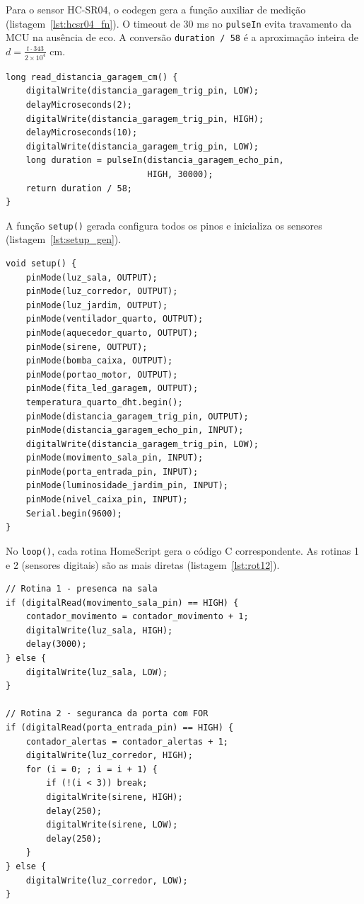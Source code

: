 \documentclass[conference]{IEEEtran}
\begin{document}
Para o sensor HC-SR04, o codegen gera a função auxiliar de medição
(listagem~\ref{lst:hcsr04_fn}). O timeout de 30 ms no \texttt{pulseIn}
evita travamento da MCU na ausência de eco. A conversão
\texttt{duration / 58} é a aproximação inteira de
$d = \frac{t \cdot 343}{2 \times 10^{4}}$ cm.

\begin{lstlisting}[style=csmall,caption={Função auxiliar gerada para o HC-SR04.},label={lst:hcsr04_fn}]
long read_distancia_garagem_cm() {
    digitalWrite(distancia_garagem_trig_pin, LOW);
    delayMicroseconds(2);
    digitalWrite(distancia_garagem_trig_pin, HIGH);
    delayMicroseconds(10);
    digitalWrite(distancia_garagem_trig_pin, LOW);
    long duration = pulseIn(distancia_garagem_echo_pin,
                            HIGH, 30000);
    return duration / 58;
}
\end{lstlisting}

A função \texttt{setup()} gerada configura todos os pinos e inicializa os
sensores (listagem~\ref{lst:setup_gen}).

\begin{lstlisting}[style=csmall,caption={Função \texttt{setup()} gerada.},label={lst:setup_gen}]
void setup() {
    pinMode(luz_sala, OUTPUT);
    pinMode(luz_corredor, OUTPUT);
    pinMode(luz_jardim, OUTPUT);
    pinMode(ventilador_quarto, OUTPUT);
    pinMode(aquecedor_quarto, OUTPUT);
    pinMode(sirene, OUTPUT);
    pinMode(bomba_caixa, OUTPUT);
    pinMode(portao_motor, OUTPUT);
    pinMode(fita_led_garagem, OUTPUT);
    temperatura_quarto_dht.begin();
    pinMode(distancia_garagem_trig_pin, OUTPUT);
    pinMode(distancia_garagem_echo_pin, INPUT);
    digitalWrite(distancia_garagem_trig_pin, LOW);
    pinMode(movimento_sala_pin, INPUT);
    pinMode(porta_entrada_pin, INPUT);
    pinMode(luminosidade_jardim_pin, INPUT);
    pinMode(nivel_caixa_pin, INPUT);
    Serial.begin(9600);
}
\end{lstlisting}

No \texttt{loop()}, cada rotina HomeScript gera o código C correspondente.
As rotinas 1 e 2 (sensores digitais) são as mais diretas
(listagem~\ref{lst:rot12}).

\begin{lstlisting}[style=csmall,caption={Rotinas 1 e 2 geradas no \texttt{loop()}.},label={lst:rot12}]
// Rotina 1 - presenca na sala
if (digitalRead(movimento_sala_pin) == HIGH) {
    contador_movimento = contador_movimento + 1;
    digitalWrite(luz_sala, HIGH);
    delay(3000);
} else {
    digitalWrite(luz_sala, LOW);
}

// Rotina 2 - seguranca da porta com FOR
if (digitalRead(porta_entrada_pin) == HIGH) {
    contador_alertas = contador_alertas + 1;
    digitalWrite(luz_corredor, HIGH);
    for (i = 0; ; i = i + 1) {
        if (!(i < 3)) break;
        digitalWrite(sirene, HIGH);
        delay(250);
        digitalWrite(sirene, LOW);
        delay(250);
    }
} else {
    digitalWrite(luz_corredor, LOW);
}
\end{lstlisting}
\end{document}
